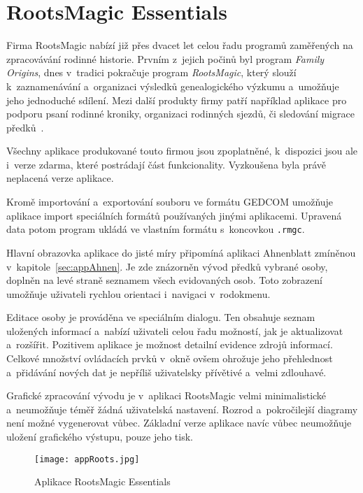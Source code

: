 		\section{RootsMagic Essentials}
		Firma RootsMagic nabízí již přes dvacet let celou řadu programů zaměřených na zpracovávání rodinné historie. Prvním z~jejich počinů byl program \emph{Family Origins}, dnes v~tradici pokračuje program \emph{RootsMagic}, který slouží k~zaznamenávání a~organizaci výsledků genealogického výzkumu a~umožňuje jeho jednoduché sdílení. Mezi další produkty firmy patří například aplikace pro podporu psaní rodinné kroniky, organizaci rodinných sjezdů, či sledování migrace předků~\cite{bib:ApliRoots}. \par
		Všechny aplikace produkované touto firmou jsou zpoplatněné, k~dispozici jsou ale i~verze zdarma, které postrádají část funkcionality. Vyzkoušena byla právě neplacená verze aplikace. \par
		Kromě importování a~exportování souboru ve formátu GEDCOM umožňuje aplikace import speciálních formátů používaných jinými aplikacemi. Upravená data potom program ukládá ve vlastním formátu s~koncovkou \texttt{.rmgc}. \par
		Hlavní obrazovka aplikace do jisté míry připomíná aplikaci Ahnenblatt zmíněnou v~kapitole~\ref{sec:appAhnen}. Je zde znázorněn vývod předků vybrané osoby, doplněn na levé straně seznamem všech evidovaných osob. Toto zobrazení umožňuje uživateli rychlou orientaci i~navigaci v~rodokmenu. \par
		Editace osoby je prováděna ve speciálním dialogu. Ten obsahuje seznam uložených informací a~nabízí uživateli celou řadu možností, jak je aktualizovat a~rozšířit. Pozitivem aplikace je možnost detailní evidence zdrojů informací. Celkové množství ovládacích prvků v~okně ovšem ohrožuje jeho přehlednost a~přidávání nových dat je nepříliš uživatelsky přívětivé a~velmi zdlouhavé. \par
		Grafické zpracování vývodu je v~aplikaci RootsMagic velmi minimalistické a~neumožňuje téměř žádná uživatelská nastavení. Rozrod a~pokročilejší diagramy není možné vygenerovat vůbec. Základní verze aplikace navíc vůbec neumožňuje uložení grafického výstupu, pouze jeho tisk. \par
		\begin{figure}[H]
			\centering
			\texttt{[image: appRoots.jpg]}
			\caption{Aplikace RootsMagic Essentials}
			\label{fig:appRoots}
		\end{figure}
		
		
